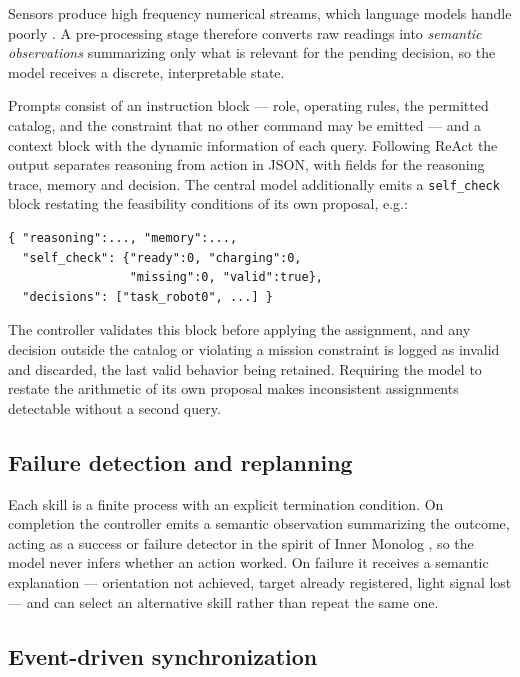 \documentclass[conference]{IEEEtran}
\begin{document}
Sensors produce high frequency numerical streams, which language models
handle poorly \cite{harnad1990,wang2023}. A pre-processing stage therefore
converts raw readings into \emph{semantic observations} summarizing only
what is relevant for the pending decision, so the model receives a discrete, interpretable state.

Prompts consist of an instruction block --- role, operating rules, the
permitted catalog, and the constraint that no other command may be
emitted --- and a context block with the dynamic information of each
query. Following ReAct \cite{yao2022} the output separates reasoning from action
in JSON, with fields for the reasoning trace, memory and decision. The central model additionally emits a
\texttt{self\_check} block restating the feasibility conditions of its own
proposal, e.g.:

{\footnotesize
\begin{verbatim}
{ "reasoning":..., "memory":...,
  "self_check": {"ready":0, "charging":0,
                 "missing":0, "valid":true},
  "decisions": ["task_robot0", ...] }
\end{verbatim}
}

\noindent The controller validates this block before applying the
assignment, and any decision outside the catalog or violating a mission
constraint is logged as invalid and discarded, the last valid behavior
being retained. Requiring the model to restate the arithmetic of its own
proposal makes inconsistent assignments detectable without a second
query.

\subsection{Failure detection and replanning}

Each skill is a finite process with an explicit termination condition. On
completion the controller emits a semantic observation summarizing the
outcome, acting as a success or failure detector in the spirit of Inner Monolog
\cite{huang2022}, so the model never infers whether an action worked. On failure it receives a semantic explanation ---
orientation not achieved, target already registered, light signal lost
--- and can select an alternative skill rather than repeat the same
one.

\subsection{Event-driven synchronization}
\end{document}
